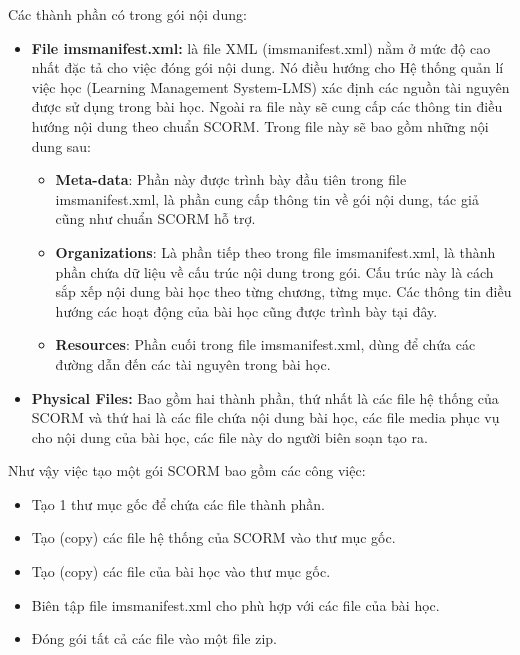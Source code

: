 \newpage

	Các thành phần có trong gói nội dung: \\
	
	\begin{itemize}
	
	\item \textbf{File imsmanifest.xml:} là file XML (imsmanifest.xml) nằm ở mức độ cao nhất đặc tả cho việc đóng gói nội dung. Nó điều hướng cho Hệ thống quản lí việc học (Learning Management System-LMS) xác định các nguồn tài nguyên được sử dụng trong bài học. Ngoài ra file này sẽ cung cấp các thông tin điều hướng nội dung theo chuẩn SCORM. Trong file này sẽ bao gồm những nội dung sau:\\

	\begin{itemize}
		\item \textbf{Meta-data}: Phần này được trình bày đầu tiên trong file imsmanifest.xml, là phần cung cấp thông tin về gói nội dung, tác giả cũng như chuẩn SCORM hỗ trợ.
	
		\item \textbf{Organizations}: Là phần tiếp theo trong file imsmanifest.xml, là thành phần chứa dữ liệu về cấu trúc nội dung trong gói. Cấu trúc này là cách sắp xếp nội dung bài học theo từng chương, từng mục. Các thông tin điều hướng các hoạt động của bài học cũng được trình bày tại đây.
	
		\item \textbf{Resources}: Phần cuối trong file imsmanifest.xml, dùng để chứa các đường dẫn đến các tài nguyên trong bài học.
	\end{itemize}


	\item \textbf{Physical Files:} Bao gồm hai thành phần, thứ nhất là các file hệ thống của SCORM và thứ hai là các file chứa nội dung bài học, các file media phục vụ cho nội dung của bài học, các file này do người biên soạn tạo ra.\\

\end{itemize}
\vspace{0.5cm}
Như vậy việc tạo một gói SCORM bao gồm các công việc:
\begin{itemize}
	\item Tạo 1 thư mục gốc để chứa các file thành phần.
	\item Tạo (copy) các file hệ thống của SCORM vào thư mục gốc.
	\item Tạo (copy) các file của bài học vào thư mục gốc.
	\item Biên tập file imsmanifest.xml cho phù hợp với các file của bài học.
	\item Đóng gói tất cả các file vào một file zip.
\end{itemize}

